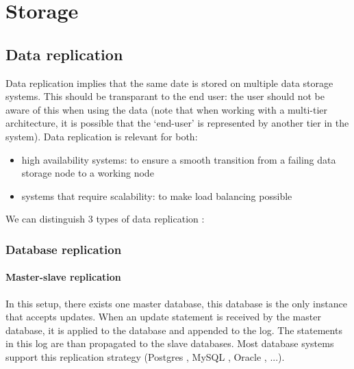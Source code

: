 \documentclass[12pt]{report}
\begin{document}
\section{Storage}

\subsection{Data replication}
Data replication implies that the same date is stored on multiple
data storage systems. This should be transparant to the end user: the
user should not be aware of this when using the data (note that when
working with a multi-tier architecture, it is possible that the
`end-user'  is represented by another tier in the system).
Data replication is relevant for both:
\begin{itemize}
\item high availability systems: to ensure a smooth transition from a
  failing data storage node to a working node
\item systems that require scalability: to make load balancing possible
\end{itemize}
We can distinguish 3 types of data replication
\cite{datareplication:2013} :

\subsubsection{Database replication}

\paragraph*{Master-slave replication}
In this setup, there exists one master database, this database is the only instance
that accepts updates. When an update statement is received by the
master database, it is applied to the database and appended to the log. The statements
in this log are than propagated to the slave databases.
Most database systems support this replication strategy (Postgres \cite{postgres_db:2013},
MySQL \cite{mysql_db:2013}, Oracle \cite{oracle_db:2013}, ...).
\end{document}
